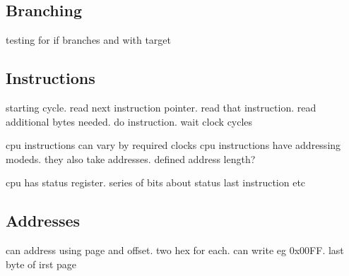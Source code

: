 
\subsection{Branching}

testing for if branches and with target

\subsection{Instructions}
starting cycle. read next instruction pointer. read that instruction. read additional bytes needed. do instruction. wait clock cycles

cpu instructions can vary by required clocks
cpu instructions have addressing modeds. they also take addresses. defined address length?

cpu has status register. series of bits about status
last instruction etc
\subsection{Addresses}
can address using page and offset. two hex for each.
can write eg 0x00FF. last byte of irst page

